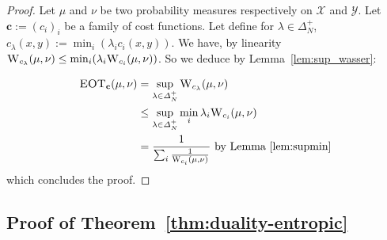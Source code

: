 \begin{proof}
Let $\mu$ and $\nu$ be two probability measures respectively on $\mathcal{X}$ and $\mathcal{Y}$. Let $\mathbf{c}:=(c_i)_i$ be a family of cost functions. Let define for $\lambda\in\Delta_N^{+}$, $c_\lambda(x,y) := \min_i(\lambda_i c_i(x,y))$. We have, by linearity $\textsc{W}_{c_\lambda}(\mu,\nu)\leq \min_i(\lambda_i \textsc{W}_{c_i}(\mu,\nu))$. So we deduce by Lemma~\ref{lem:sup_wasser}:

\begin{align*}
    \textsc{EOT}_{\mathbf{c}}(\mu,\nu)&=\sup_{\lambda\in\Delta_N^{+}} \textsc{W}_{c_\lambda}(\mu,\nu)\\
    &\leq\sup_{\lambda\in\Delta_N^{+}} \min_i\lambda_i \textsc{W}_{c_i}(\mu,\nu)\\
    &= \frac{1}{\sum_i\frac{1}{\textsc{W}_{c_i}(\mu,\nu)}}\text{ by Lemma~\ref{lem:supmin}}\\ 
\end{align*}
which concludes the proof.
\end{proof}




\subsection{Proof of Theorem~\ref{thm:duality-entropic}}
\label{prv:duality-entropic}




